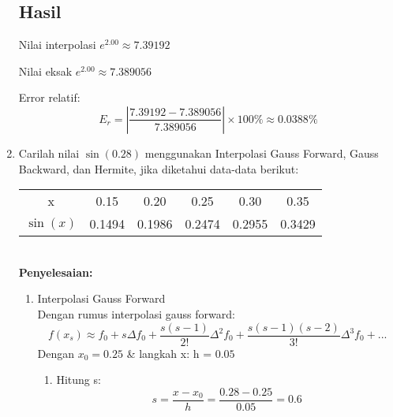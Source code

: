 \documentclass{article}
\newcommand{\penyelesaian}{\textbf{Penyelesaian: }}
\begin{document}
\begin{enumerate}
    \subsection*{Hasil}
    Nilai interpolasi \( e^{2.00} \approx 7.39192 \)

    Nilai eksak \( e^{2.00} \approx 7.389056 \)

    Error relatif:
    \[
    \text{\(E_r\)} = \left| \frac{7.39192 - 7.389056}{7.389056} \right| \times 100\% \approx 0.0388\%
    \]

    \item Carilah nilai $\sin(\num{0,28})$ menggunakan Interpolasi Gauss Forward, Gauss Backward, dan Hermite, jika diketahui data-data berikut: \\
    \begin{tabular}{ c c c c c c }
        x & \num{0,15} & \num{0,20} & \num{0,25} & \num{0,30} & \num{0,35} \\
        $\sin(x)$ & \num{0,1494} & \num{0,1986} & \num{0,2474} & \num{0,2955} & \num{0,3429} \\
    \end{tabular} \\
    \penyelesaian 
    \begin{enumerate}
        \item Interpolasi Gauss Forward \\
        Dengan rumus interpolasi gauss forward: 
        \[
        f(x_s) \approx f_0 + s\Delta f_0 + \frac{s(s-1)}{2!}\Delta ^2f_0 + \frac{s(s-1)(s-2)}{3!}\Delta ^3f_0 + ...
        \]
        Dengan $x_0 = \num{0,25}$ \& langkah x: h = $\num{0,05}$ 
        \begin{enumerate}
            \item Hitung s: \\
            \[
            s = \frac{x-x_0}{h} = \frac{0.28 - 0.25}{0.05} = 0.6
            \]


\end{enumerate}
\end{enumerate}
\end{enumerate}
\end{document}
